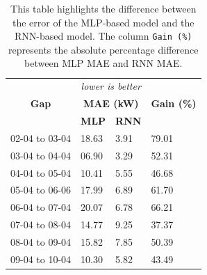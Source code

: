 \begin{table}[H]
	\centering
	\begin{tabular}{l|l|l|l}
		\multicolumn{1}{c}{}                         &
		\multicolumn{2}{c}{\textit{lower is better}} &                                                   \\
		\multicolumn{1}{c|}{\textbf{Gap}}            &
		\multicolumn{2}{c|}{\textbf{MAE (kW)}}       &
		\multicolumn{1}{c}{\textbf{Gain (\%)}}                                                           \\ %
		\hline
		                                             & \small \textbf{MLP} & \small \textbf{RNN} &       \\
		\cline{2-3}
		02-04 to 03-04                               & 18.63               & 3.91                & 79.01 \\
		03-04 to 04-04                               & 06.90               & 3.29                & 52.31 \\
		04-04 to 05-04                               & 10.41               & 5.55                & 46.68 \\
		05-04 to 06-06                               & 17.99               & 6.89                & 61.70 \\
		06-04 to 07-04                               & 20.07               & 6.78                & 66.21 \\
		07-04 to 08-04                               & 14.77               & 9.25                & 37.37 \\
		08-04 to 09-04                               & 15.82               & 7.85                & 50.39 \\
		09-04 to 10-04                               & 10.30               & 5.82                & 43.49
	\end{tabular}
	\caption{This table highlights the difference between the error of the MLP-based model and the RNN-based model. The column \texttt{Gain (\%)} represents the absolute percentage difference between MLP MAE and RNN MAE.}
	\label{tab:mlpvsrnndiff}
\end{table}

